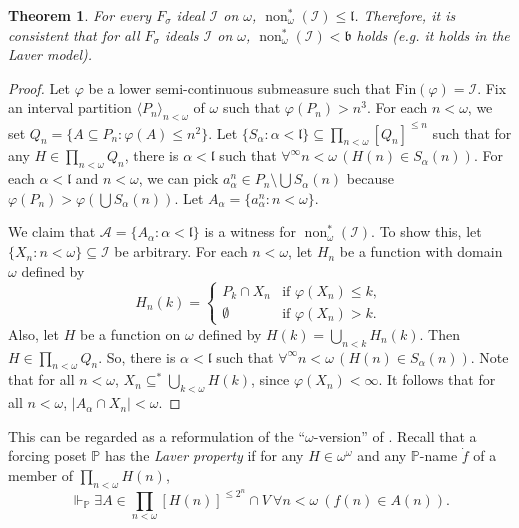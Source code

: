 \documentclass[a4paper,12pt]{amsart}
\newtheorem{thm}{Theorem}
\theoremstyle{definition}
\numberwithin{thm}{section}
\numberwithin{equation}{section}
\newcommand{\p}{\mathbb{P}}
\newcommand{\oo}{{\omega}^\omega}
\newcommand{\bb}{\mathfrak{b}}
\DeclareMathOperator{\non}{non}
\newcommand{\I}{\mathscr{I}}
\renewcommand{\subset}{\subseteq}
\begin{document}
    \begin{thm}
        For every $F_\sigma$ ideal $\I$ on $\omega$, $\non^*_\omega(\I)\leq\mathfrak{l}$. Therefore, it is consistent that for all $F_\sigma$ ideals $\I$ on $\omega$, $\non^*_\omega(\I) < \bb$ holds (e.g. it holds in the Laver model).
    \end{thm}
    \begin{proof}
        Let $\varphi$ be a lower semi-continuous submeasure such that $\mathrm{Fin}(\varphi) = \mathscr{I}$. Fix an interval partition $\langle P_n\rangle_{n<\omega}$ of $\omega$ such that $\varphi(P_n) > n^3$. For each $n<\omega$, we set $Q_n = \{A\subset P_n:\varphi(A)\leq n^2\}$. Let $\{S_\alpha:\alpha<\mathfrak{l}\}\subset\prod_{n<\omega}[Q_n]^{\leq n}$ such that for any $H\in\prod_{n<\omega}Q_n$, there is $\alpha<\mathfrak{l}$ such that $\forall^\infty n<\omega\,(H(n)\in S_\alpha(n))$. For each $\alpha < \mathfrak{l}$ and $n<\omega$, we can pick $a_{\alpha}^n\in P_n\setminus\bigcup S_\alpha(n)$ because $\varphi(P_n)> \varphi(\bigcup S_\alpha(n))$. Let $A_\alpha = \{a_{\alpha}^n: n<\omega\}$.

        We claim that $\mathcal{A} = \{A_\alpha:\alpha<\mathfrak{l}\}$ is a witness for $\non^*_\omega(\I)$. To show this, let $\{X_n : n<\omega\}\subset \I$ be arbitrary. For each $n<\omega$, let $H_n$ be a function with domain $\omega$ defined by
        \[
        H_n(k) =
        \begin{cases}
            P_k \cap X_n & \text{if }\varphi(X_n)\leq k,\\
        \emptyset & \text{if }\varphi(X_n)>k.
        \end{cases}
        \]
        Also, let $H$ be a function on $\omega$ defined by $H(k) = \bigcup_{n < k}H_n(k)$. Then $H\in\prod_{n<\omega}Q_n$. So, there is $\alpha < \mathfrak{l}$ such that $\forall^\infty n<\omega\,(H(n)\in S_\alpha(n))$. Note that for all $n<\omega$, $X_n\subset^*\bigcup_{k<\omega}H(k)$, since $\varphi(X_n)<\infty$. It follows that for all $n<\omega$, $\lvert A_\alpha \cap X_n \rvert < \omega$.
    \end{proof}

    This can be regarded as a reformulation of the ``$\omega$-version'' of \cite[Theorem 4.3 and Lemma 4.4]{HMM10}.
    Recall that a forcing poset $\p$ has the \emph{Laver property} if for any $H\in\oo$ and any $\p$-name $\dot{f}$ of a member of $\prod_{n<\omega}H(n)$,  
    \[
    \Vdash_{\p}\exists A\in\prod_{n<\omega}[H(n)]^{\leq2^n}\cap V~\forall n<\omega~(f(n)\in A(n)).
    \]
\end{document}
